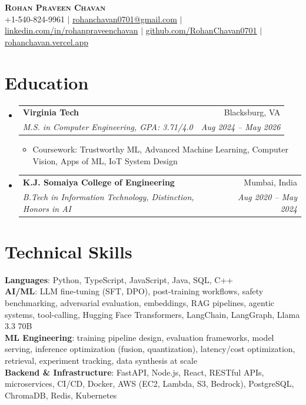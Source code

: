 \documentclass[letterpaper,10pt]{article}
\makeatletter
\newcommand{\resumeItem}[1]{\item\small{#1 \vspace{-2.5pt}}}
\newcommand{\resumeSubheading}[4]{
  \vspace{-2pt}\item
    \begin{tabular*}{0.97\textwidth}[t]{l@{\extracolsep{\fill}}r}
      \textbf{#1} & #2 \\
      \textit{\small#3} & \textit{\small #4} \\
    \end{tabular*}\vspace{-7pt}
}
\newcommand{\resumeSubHeadingListStart}{\begin{itemize}[leftmargin=0.15in, label={}]}
\newcommand{\resumeSubHeadingListEnd}{\end{itemize}}
\newcommand{\resumeItemListStart}{\begin{itemize}}
\newcommand{\resumeItemListEnd}{\end{itemize}\vspace{-5pt}}
\makeatother
\begin{document}
\begin{center}
    \textbf{\Huge \scshape Rohan Praveen Chavan} \\ \vspace{2pt}
    \small +1-540-824-9961 $|$
    \href{mailto:rohanchavan0701@gmail.com}{\underline{rohanchavan0701@gmail.com}} $|$
    \href{https://linkedin.com/in/rohanpraveenchavan}{\underline{linkedin.com/in/rohanpraveenchavan}} $|$
    \href{https://github.com/RohanChavan0701}{\underline{github.com/RohanChavan0701}} $|$
    \href{https://rohanchavan.vercel.app}{\underline{rohanchavan.vercel.app}}
\end{center}

\section{Education}
\resumeSubHeadingListStart
    \resumeSubheading
      {Virginia Tech}{Blacksburg, VA}
      {M.S. in Computer Engineering, GPA: 3.71/4.0}{Aug 2024 -- May 2026}
      \resumeItemListStart
        \resumeItem{Coursework: Trustworthy ML, Advanced Machine Learning, Computer Vision, Apps of ML, IoT System Design}
      \resumeItemListEnd
    \resumeSubheading
      {K.J. Somaiya College of Engineering}{Mumbai, India}
      {B.Tech in Information Technology, Distinction, Honors in AI}{Aug 2020 -- May 2024}
\resumeSubHeadingListEnd

\section{Technical Skills}
\begin{itemize}[leftmargin=0.15in, label={}]
    \small{\item{
     \textbf{Languages}{: Python, TypeScript, JavaScript, Java, SQL, C++} \\
     \textbf{AI/ML}{: LLM fine-tuning (SFT, DPO), post-training workflows, safety benchmarking,
       adversarial evaluation, embeddings, RAG pipelines, agentic systems, tool-calling,
       Hugging Face Transformers, LangChain, LangGraph, Llama 3.3 70B} \\
     \textbf{ML Engineering}{: training pipeline design, evaluation frameworks, model serving,
       inference optimization (fusion, quantization), latency/cost optimization,
       retrieval, experiment tracking, data synthesis at scale} \\
     \textbf{Backend \& Infrastructure}{: FastAPI, Node.js, React, RESTful APIs, microservices,
       CI/CD, Docker, AWS (EC2, Lambda, S3, Bedrock), PostgreSQL, ChromaDB, Redis, Kubernetes}
    }}
\end{itemize}
\end{document}
